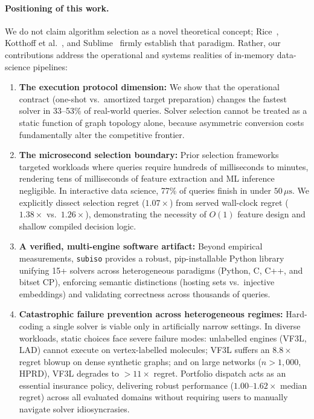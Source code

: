 \documentclass[11pt,a4paper]{article}
\begin{document}
\paragraph{Positioning of this work.} We do not claim algorithm selection as a novel theoretical concept; Rice~\cite{rice1976algorithm}, Kotthoff et al.~\cite{kotthoff2016portfolios}, and Sublime~\cite{kuraya2026sublime} firmly establish that paradigm. Rather, our contributions address the operational and systems realities of in-memory data-science pipelines:
\begin{enumerate}
    \item \textbf{The execution protocol dimension:} We show that the operational contract (one-shot vs.\ amortized target preparation) changes the fastest solver in 33--53\% of real-world queries. Solver selection cannot be treated as a static function of graph topology alone, because asymmetric conversion costs fundamentally alter the competitive frontier.
    \item \textbf{The microsecond selection boundary:} Prior selection frameworks targeted workloads where queries require hundreds of milliseconds to minutes, rendering tens of milliseconds of feature extraction and ML inference negligible. In interactive data science, 77\% of queries finish in under $50\,\mu\text{s}$. We explicitly dissect selection regret ($1.07\times$) from served wall-clock regret ($1.38\times$ vs.\ $1.26\times$), demonstrating the necessity of $O(1)$ feature design and shallow compiled decision logic.
    \item \textbf{A verified, multi-engine software artifact:} Beyond empirical measurements, \texttt{subiso} provides a robust, pip-installable Python library unifying 15+ solvers across heterogeneous paradigms (Python, C, C++, and bitset CP), enforcing semantic distinctions (hosting sets vs.\ injective embeddings) and validating correctness across thousands of queries.
    \item \textbf{Catastrophic failure prevention across heterogeneous regimes:} Hard-coding a single solver is viable only in artificially narrow settings. In diverse workloads, static choices face severe failure modes: unlabelled engines (VF3L, LAD) cannot execute on vertex-labelled molecules; VF3L suffers an $8.8\times$ regret blowup on dense synthetic graphs; and on large networks ($n > 1{,}000$, HPRD), VF3L degrades to $>11\times$ regret. Portfolio dispatch acts as an essential insurance policy, delivering robust performance ($1.00\text{--}1.62\times$ median regret) across all evaluated domains without requiring users to manually navigate solver idiosyncrasies.
\end{enumerate}
\end{document}
